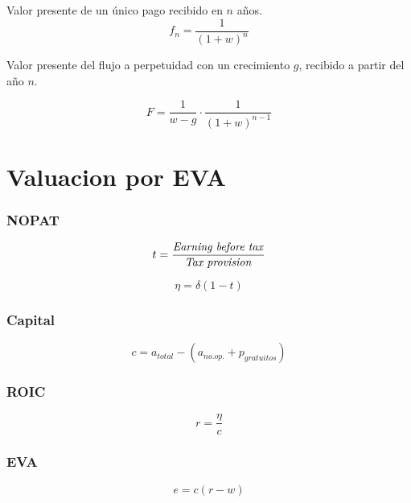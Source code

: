 Valor presente de un único pago recibido en $n$ años.
\begin{equation}
    f_n = \frac{1}{\left(1+w\right)^n}
\end{equation}

Valor presente del flujo a perpetuidad con un crecimiento $g$, recibido a partir del año $n$.

\begin{equation}
    F = \frac{1}{w-g}\cdot\frac{1}{\left(1+w\right)^{n-1}}
\end{equation}



\section{Valuacion por EVA}

\subsubsection*{NOPAT}

\begin{equation}
    t = \frac{\textrm{\textit{Earning before tax}}}{\textrm{\textit{Tax provision}}}
\end{equation}

\begin{equation}
    \eta = \delta(1-t)
\end{equation}

\subsubsection*{Capital}
\begin{equation}
    c = a_{total} - \left(a_{no.op.} + p_{gratuitos} \right)
\end{equation}

\subsubsection*{ROIC}
\begin{equation}
    r = \frac{\eta}{c}
\end{equation}

\subsubsection*{EVA}
\begin{equation}
    e = c(r-w)
\end{equation}


